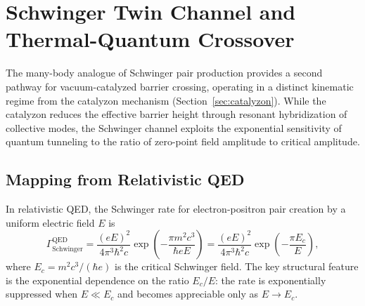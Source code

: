 \documentclass[11pt,letterpaper]{article}
\begin{document}
\section{Schwinger Twin Channel and Thermal-Quantum Crossover}
\label{sec:schwinger_twin}

The many-body analogue of Schwinger pair production provides a second pathway for vacuum-catalyzed barrier crossing, operating in a distinct kinematic regime from the catalyzon mechanism (Section~\ref{sec:catalyzon}). While the catalyzon reduces the effective barrier height through resonant hybridization of collective modes, the Schwinger channel exploits the exponential sensitivity of quantum tunneling to the ratio of zero-point field amplitude to critical amplitude.

\subsection{Mapping from Relativistic QED}

In relativistic QED, the Schwinger rate for electron-positron pair creation by a uniform electric field $E$ is\cite{Schwinger1951,Kim2023schwinger}
\begin{equation}
\Gamma_{\text{Schwinger}}^{\text{QED}} = \frac{(eE)^2}{4\pi^3 \hbar^2 c} \exp\left(-\frac{\pi m^2 c^3}{\hbar e E}\right) = \frac{(eE)^2}{4\pi^3 \hbar^2 c} \exp\left(-\frac{\pi E_c}{E}\right),
\end{equation}
where $E_c = m^2 c^3 / (\hbar e)$ is the critical Schwinger field. The key structural feature is the exponential dependence on the ratio $E_c/E$: the rate is exponentially suppressed when $E \ll E_c$ and becomes appreciable only as $E \to E_c$.
\end{document}
